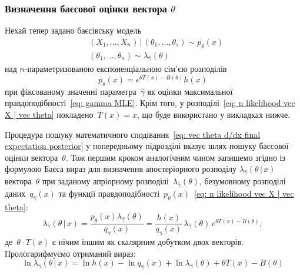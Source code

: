 \documentclass{mathreport}
\begin{document}
\subsubsection*{Визначення баєсової оцінки вектора $\theta$}

Нехай тепер задано баєсівську модель
\begin{align}
    & (X_1,\ldots,X_n) \,|\, (\theta_1,\ldots,\theta_s) \sim p_{\theta}(x) \label{eq: duplicated vec X | vec theta} \\
    & (\theta_1,\ldots,\theta_n) \sim \lambda_{\widehat{\gamma}}(\theta) \label{eq: vec n theta}
\end{align} 
над $n$-параметризованою експоненціальною сім'єю розподілів 
\begin{equation}\label{eq: n likelihood vec X | vec theta}
    p_{\theta}(x) = e^{\theta T(x) - B(\theta)}h(x)
\end{equation}
при фіксованому значенні параметра~$\widehat{\gamma}$ як оцінки максимальної правдоподібності~\eqref{eq: gamma MLE}. Крім того, у розподілі~\eqref{eq: n likelihood vec X | vec theta} покладено~$T(x)=x$, що буде використано у викладках нижче.

Процедура пошуку математичного сподівання~\eqref{eq: vec theta d/dx final expectation posterior} у попередньому підрозділі вказує шлях пошуку баєсової оцінки вектора~$\theta$. Тож першим кроком аналогічним чином запишемо згідно із формулою Баєса вираз для визначення апостеріорного розподілу $\lambda_{\widehat{\gamma}}(\theta \,|\, x)$ вектора~$\theta$ при заданому апріорному розподілі~$\lambda_{\widehat{\gamma}}(\theta)$, безумовному розподілі даних~$q_{\widehat{\gamma}}(x)$ та функції правдоподібності~$p_{\theta}(x)$~\eqref{eq: n likelihood vec X | vec theta}:
\begin{equation}\label{eq: n vec theta posterior}
    \lambda_{\widehat{\gamma}}(\theta \,|\, x) = \frac{p_{\theta}(x)\lambda_{\widehat{\gamma}}(\theta)}{q_{\widehat{\gamma}}(x)} = 
    \frac{h(x)}{q_{\widehat{\gamma}}(x)}\,\lambda_{\widehat{\gamma}}(\theta)\,e^{\theta T(x) - B(\theta)},
\end{equation}
де~$\theta \cdot T(x)$ є нічим іншим як скалярним добутком двох векторів. Прологарифмуємо отриманий вираз:
\begin{equation}\label{eq: n vec theta ln posterior}
    \ln{\lambda_{\widehat{\gamma}}(\theta \,|\, x)} = \ln{h(x)} - \ln{q_{\widehat{\gamma}}(x)} + \ln{\lambda_{\widehat{\gamma}}(\theta)} + \theta T(x) - B(\theta)
\end{equation}
\end{document}
